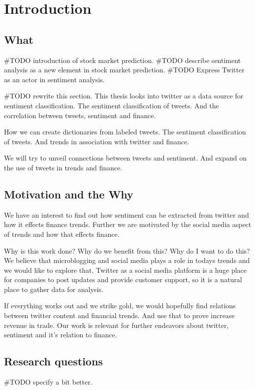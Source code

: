 \chapter{Introduction}\label{introduction}

\section{What}

#TODO introduction of stock market prediction. 
#TODO describe sentiment analysis as a new element in stock market prediction.  
#TODO Express Twitter as an actor in sentiment analysis. 

#TODO rewrite this section.
This thesis looks into twitter as a data source for sentiment classification.
The sentiment classification of tweets. And the correlation between tweets,
sentiment and finance. 

How we can create dictionaries from labeled tweets. The sentiment classification
of tweets. And trends in association with twitter and finance. 

We will try to unveil connections between tweets and sentiment. And expand on
the use of tweets in trends and finance. 
%

\section{Motivation and the Why}
We have an interest to find out how sentiment can be extracted from twitter and
how it effects finance trends. Further we are motivated by the social media
aspect of trends and how that effects finance. 

Why is this work done? Why do we benefit from this? Why do I want to do this?
We believe that microblogging and social media plays a role in todays trends
and we would like to explore that. Twitter as a social media platform is a huge
place for companies to post updates and provide customer support, so it is a
natural place to gather data for analysis. 

If everything works out and we strike gold, we would hopefully find relations
between twitter content and financial trends. And use that to prove increase
revenue in trade. Our work is relevant for further endeavors about twitter,
sentiment and it's relation to finance. 

\section{Research questions}\label{introduction:research_questions}
#TODO specify a bit better. 

